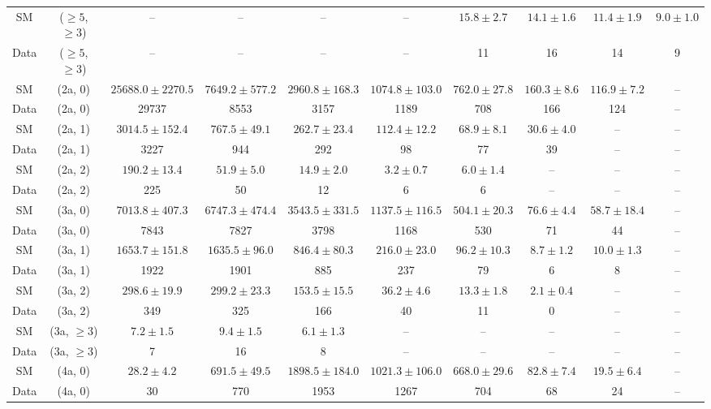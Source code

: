 \begin{table}[h!]
{\begin{tabular}{cccccccccc}
	SM & ($\ge5$, $\ge3$) & -- & -- & -- & -- & $15.8\pm 2.7$ & $14.1\pm 1.6$ & $11.4\pm 1.9$ & $9.0\pm 1.0$ \\[0.5ex] 
	Data & ($\ge5$, $\ge3$) & -- & -- & -- & -- & 11 & 16 & 14 & 9 \\[0.5ex] 
	SM & (2a, 0) & $25688.0\pm 2270.5$ & $7649.2\pm 577.2$ & $2960.8\pm 168.3$ & $1074.8\pm 103.0$ & $762.0\pm 27.8$ & $160.3\pm 8.6$ & $116.9\pm 7.2$ & -- \\[0.5ex] 
	Data & (2a, 0) & 29737 & 8553 & 3157 & 1189 & 708 & 166 & 124 & -- \\[0.5ex] 
	SM & (2a, 1) & $3014.5\pm 152.4$ & $767.5\pm 49.1$ & $262.7\pm 23.4$ & $112.4\pm 12.2$ & $68.9\pm 8.1$ & $30.6\pm 4.0$ & -- & -- \\[0.5ex] 
	Data & (2a, 1) & 3227 & 944 & 292 & 98 & 77 & 39 & -- & -- \\[0.5ex] 
	SM & (2a, 2) & $190.2\pm 13.4$ & $51.9\pm 5.0$ & $14.9\pm 2.0$ & $3.2\pm 0.7$ & $6.0\pm 1.4$ & -- & -- & -- \\[0.5ex] 
	Data & (2a, 2) & 225 & 50 & 12 & 6 & 6 & -- & -- & -- \\[0.5ex] 
	SM & (3a, 0) & $7013.8\pm 407.3$ & $6747.3\pm 474.4$ & $3543.5\pm 331.5$ & $1137.5\pm 116.5$ & $504.1\pm 20.3$ & $76.6\pm 4.4$ & $58.7\pm 18.4$ & -- \\[0.5ex] 
	Data & (3a, 0) & 7843 & 7827 & 3798 & 1168 & 530 & 71 & 44 & -- \\[0.5ex] 
	SM & (3a, 1) & $1653.7\pm 151.8$ & $1635.5\pm 96.0$ & $846.4\pm 80.3$ & $216.0\pm 23.0$ & $96.2\pm 10.3$ & $8.7\pm 1.2$ & $10.0\pm 1.3$ & -- \\[0.5ex] 
	Data & (3a, 1) & 1922 & 1901 & 885 & 237 & 79 & 6 & 8 & -- \\[0.5ex] 
	SM & (3a, 2) & $298.6\pm 19.9$ & $299.2\pm 23.3$ & $153.5\pm 15.5$ & $36.2\pm 4.6$ & $13.3\pm 1.8$ & $2.1\pm 0.4$ & -- & -- \\[0.5ex] 
	Data & (3a, 2) & 349 & 325 & 166 & 40 & 11 & 0 & -- & -- \\[0.5ex] 
	SM & (3a, $\ge3$) & $7.2\pm 1.5$ & $9.4\pm 1.5$ & $6.1\pm 1.3$ & -- & -- & -- & -- & -- \\[0.5ex] 
	Data & (3a, $\ge3$) & 7 & 16 & 8 & -- & -- & -- & -- & -- \\[0.5ex] 
	SM & (4a, 0) & $28.2\pm 4.2$ & $691.5\pm 49.5$ & $1898.5\pm 184.0$ & $1021.3\pm 106.0$ & $668.0\pm 29.6$ & $82.8\pm 7.4$ & $19.5\pm 6.4$ & -- \\[0.5ex] 
	Data & (4a, 0) & 30 & 770 & 1953 & 1267 & 704 & 68 & 24 & -- \\[0.5ex] 

\end{tabular}}
\end{table}
